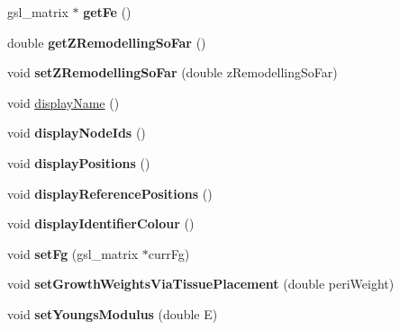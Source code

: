 \begin{DoxyCompactItemize}
\item 
\hypertarget{classShapeBase_a26de227e5135a355667be3a2a86d1431}{}gsl\+\_\+matrix $\ast$ {\bfseries get\+Fe} ()\label{classShapeBase_a26de227e5135a355667be3a2a86d1431}

\item 
\hypertarget{classShapeBase_a4916a23d305f1258ec83b7e53adabea1}{}double {\bfseries get\+Z\+Remodelling\+So\+Far} ()\label{classShapeBase_a4916a23d305f1258ec83b7e53adabea1}

\item 
\hypertarget{classShapeBase_ad225c2235e531e5ee239a127bbf92def}{}void {\bfseries set\+Z\+Remodelling\+So\+Far} (double z\+Remodelling\+So\+Far)\label{classShapeBase_ad225c2235e531e5ee239a127bbf92def}

\item 
void \hyperlink{classShapeBase_ab8a7323c50767ecdc82d8d8ce411b264}{display\+Name} ()
\item 
\hypertarget{classShapeBase_a324f8fd5dd90c14b621b2f2ee3ec98db}{}void {\bfseries display\+Node\+Ids} ()\label{classShapeBase_a324f8fd5dd90c14b621b2f2ee3ec98db}

\item 
\hypertarget{classShapeBase_aca4d0f70caf459dc93f914ef7fc2a053}{}void {\bfseries display\+Positions} ()\label{classShapeBase_aca4d0f70caf459dc93f914ef7fc2a053}

\item 
\hypertarget{classShapeBase_af2d221cf63220dad3ecf139ffa164698}{}void {\bfseries display\+Reference\+Positions} ()\label{classShapeBase_af2d221cf63220dad3ecf139ffa164698}

\item 
\hypertarget{classShapeBase_aba6bb76d8adffaeb7ad36cce8a3f17ab}{}void {\bfseries display\+Identifier\+Colour} ()\label{classShapeBase_aba6bb76d8adffaeb7ad36cce8a3f17ab}

\item 
\hypertarget{classShapeBase_ad39c3f3a555a89e106c4afaaf81c72f6}{}void {\bfseries set\+Fg} (gsl\+\_\+matrix $\ast$curr\+Fg)\label{classShapeBase_ad39c3f3a555a89e106c4afaaf81c72f6}

\item 
\hypertarget{classShapeBase_a38a100fb162232636bf666eb1603f023}{}void {\bfseries set\+Growth\+Weights\+Via\+Tissue\+Placement} (double peri\+Weight)\label{classShapeBase_a38a100fb162232636bf666eb1603f023}

\item 
\hypertarget{classShapeBase_a27bc09051d65ebc27e31b67462950070}{}void {\bfseries set\+Youngs\+Modulus} (double E)\label{classShapeBase_a27bc09051d65ebc27e31b67462950070}


\end{DoxyCompactItemize}
